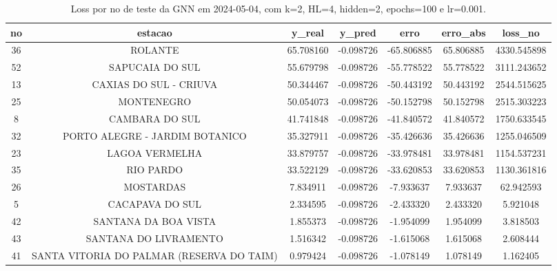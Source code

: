 \begin{table}[h]
\centering
\caption{Loss por no de teste da GNN em 2024-05-04, com k=2, HL=4, hidden=2, epochs=100 e lr=0.001.}
\label{tab:gnn_loss_k2_hl4_h2_e100_d20240504}
\begin{tabular}{ccccccc}
\toprule
no & estacao & y\_real & y\_pred & erro & erro\_abs & loss\_no \\
\midrule
36 & ROLANTE & 65.708160 & -0.098726 & -65.806885 & 65.806885 & 4330.545898 \\
52 & SAPUCAIA DO SUL & 55.679798 & -0.098726 & -55.778522 & 55.778522 & 3111.243652 \\
13 & CAXIAS DO SUL - CRIUVA & 50.344467 & -0.098726 & -50.443192 & 50.443192 & 2544.515625 \\
25 & MONTENEGRO & 50.054073 & -0.098726 & -50.152798 & 50.152798 & 2515.303223 \\
8 & CAMBARA DO SUL & 41.741848 & -0.098726 & -41.840572 & 41.840572 & 1750.633545 \\
32 & PORTO ALEGRE - JARDIM BOTANICO & 35.327911 & -0.098726 & -35.426636 & 35.426636 & 1255.046509 \\
23 & LAGOA VERMELHA & 33.879757 & -0.098726 & -33.978481 & 33.978481 & 1154.537231 \\
35 & RIO PARDO & 33.522129 & -0.098726 & -33.620853 & 33.620853 & 1130.361816 \\
26 & MOSTARDAS & 7.834911 & -0.098726 & -7.933637 & 7.933637 & 62.942593 \\
5 & CACAPAVA DO SUL & 2.334595 & -0.098726 & -2.433320 & 2.433320 & 5.921048 \\
42 & SANTANA DA BOA VISTA & 1.855373 & -0.098726 & -1.954099 & 1.954099 & 3.818503 \\
43 & SANTANA DO LIVRAMENTO & 1.516342 & -0.098726 & -1.615068 & 1.615068 & 2.608444 \\
41 & SANTA VITORIA DO PALMAR (RESERVA DO TAIM) & 0.979424 & -0.098726 & -1.078149 & 1.078149 & 1.162405 \\
\bottomrule
\end{tabular}
\end{table}
